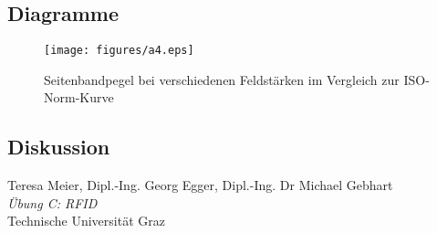 \documentclass[12pt,a4paper,ngerman]{article}
\begin{document}
\subsection{Diagramme}
\begin{figure}[H]
\centering
\texttt{[image: figures/a4.eps]} 
\caption{Seitenbandpegel bei verschiedenen Feldstärken im Vergleich zur ISO-Norm-Kurve}
\label{fig:a4}
\end{figure}

\subsection{Diskussion}

\begin{thebibliography}{9}

  Teresa Meier, Dipl.-Ing. Georg Egger, Dipl.-Ing. Dr Michael Gebhart\\
  \emph{Übung C: RFID}\\
  Technische Universität Graz
\end{thebibliography}


 



   
\end{document}
